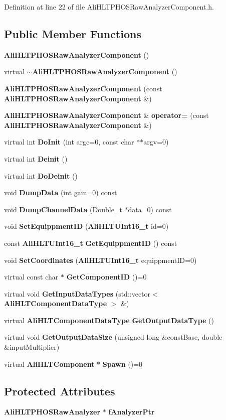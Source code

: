 Definition at line 22 of file Ali\-HLTPHOSRaw\-Analyzer\-Component.h.\subsection*{Public Member Functions}
\begin{CompactItemize}
\item 
{\bf Ali\-HLTPHOSRaw\-Analyzer\-Component} ()
\item 
virtual {\bf $\sim$Ali\-HLTPHOSRaw\-Analyzer\-Component} ()
\item 
{\bf Ali\-HLTPHOSRaw\-Analyzer\-Component} (const {\bf Ali\-HLTPHOSRaw\-Analyzer\-Component} \&)
\item 
{\bf Ali\-HLTPHOSRaw\-Analyzer\-Component} \& {\bf operator=} (const {\bf Ali\-HLTPHOSRaw\-Analyzer\-Component} \&)
\item 
virtual int {\bf Do\-Init} (int argc=0, const char $\ast$$\ast$argv=0)
\item 
virtual int {\bf Deinit} ()
\item 
virtual int {\bf Do\-Deinit} ()
\item 
void {\bf Dump\-Data} (int gain=0) const 
\item 
void {\bf Dump\-Channel\-Data} (Double\_\-t $\ast$data=0) const 
\item 
void {\bf Set\-Equippment\-ID} ({\bf Ali\-HLTUInt16\_\-t} id=0)
\item 
const {\bf Ali\-HLTUInt16\_\-t} {\bf Get\-Equippment\-ID} () const 
\item 
void {\bf Set\-Coordinates} ({\bf Ali\-HLTUInt16\_\-t} equippment\-ID=0)
\item 
virtual const char $\ast$ {\bf Get\-Component\-ID} ()=0
\item 
virtual void {\bf Get\-Input\-Data\-Types} (std::vector$<$ {\bf Ali\-HLTComponent\-Data\-Type} $>$ \&)
\item 
virtual {\bf Ali\-HLTComponent\-Data\-Type} {\bf Get\-Output\-Data\-Type} ()
\item 
virtual void {\bf Get\-Output\-Data\-Size} (unsigned long \&const\-Base, double \&input\-Multiplier)
\item 
virtual {\bf Ali\-HLTComponent} $\ast$ {\bf Spawn} ()=0
\end{CompactItemize}
\subsection*{Protected Attributes}
\begin{CompactItemize}
\item 
{\bf Ali\-HLTPHOSRaw\-Analyzer} $\ast$ {\bf f\-Analyzer\-Ptr}
\end{CompactItemize}
